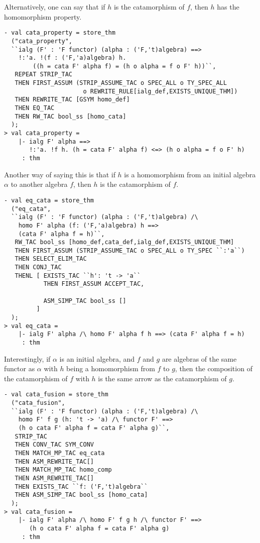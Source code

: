 Alternatively, one can say that if $h$ is the catamorphism of $f$, then $h$
has the homomorphism property.
\begin{session}
\begin{verbatim}
- val cata_property = store_thm
  ("cata_property",
  ``ialg (F' : 'F functor) (alpha : ('F,'t)algebra) ==>
    !:'a. !(f : ('F,'a)algebra) h.
        ((h = cata F' alpha f) = (h o alpha = f o F' h))``,
   REPEAT STRIP_TAC
   THEN FIRST_ASSUM (STRIP_ASSUME_TAC o SPEC_ALL o TY_SPEC_ALL
                      o REWRITE_RULE[ialg_def,EXISTS_UNIQUE_THM])
   THEN REWRITE_TAC [GSYM homo_def]
   THEN EQ_TAC
   THEN RW_TAC bool_ss [homo_cata]
  );
> val cata_property =
    |- ialg F' alpha ==>
       !:'a. !f h. (h = cata F' alpha f) <=> (h o alpha = f o F' h)
     : thm
\end{verbatim}
\end{session}

\pagebreak
Another way of saying this is that if $h$ is a homomorphism from an initial algebra 
$\alpha$ to another algebra $f$, then $h$ is the catamorphism of $f$.
\begin{session}
\begin{verbatim}
- val eq_cata = store_thm
  ("eq_cata",
  ``ialg (F' : 'F functor) (alpha : ('F,'t)algebra) /\
    homo F' alpha (f: ('F,'a)algebra) h ==>
    (cata F' alpha f = h)``,
   RW_TAC bool_ss [homo_def,cata_def,ialg_def,EXISTS_UNIQUE_THM]
   THEN FIRST_ASSUM (STRIP_ASSUME_TAC o SPEC_ALL o TY_SPEC ``:'a``)
   THEN SELECT_ELIM_TAC
   THEN CONJ_TAC
   THENL [ EXISTS_TAC ``h': 't -> 'a``
           THEN FIRST_ASSUM ACCEPT_TAC,

           ASM_SIMP_TAC bool_ss []
         ]
  );
> val eq_cata =
    |- ialg F' alpha /\ homo F' alpha f h ==> (cata F' alpha f = h)
     : thm
\end{verbatim}
\end{session}

Interestingly, if $\alpha$ is an initial algebra, and $f$ and $g$ are algebras of the same
functor as $\alpha$ with $h$ being a homomorphism from $f$ to $g$, then the composition
of the catamorphism of $f$ with $h$ is the same arrow as the catamorphism of $g$.
\begin{session}
\begin{verbatim}
- val cata_fusion = store_thm
  ("cata_fusion",
  ``ialg (F' : 'F functor) (alpha : ('F,'t)algebra) /\
    homo F' f g (h: 't -> 'a) /\ functor F' ==>
    (h o cata F' alpha f = cata F' alpha g)``,
   STRIP_TAC
   THEN CONV_TAC SYM_CONV
   THEN MATCH_MP_TAC eq_cata
   THEN ASM_REWRITE_TAC[]
   THEN MATCH_MP_TAC homo_comp
   THEN ASM_REWRITE_TAC[]
   THEN EXISTS_TAC ``f: ('F,'t)algebra``
   THEN ASM_SIMP_TAC bool_ss [homo_cata]
  );
> val cata_fusion =
    |- ialg F' alpha /\ homo F' f g h /\ functor F' ==>
       (h o cata F' alpha f = cata F' alpha g)
     : thm
\end{verbatim}
\end{session}

